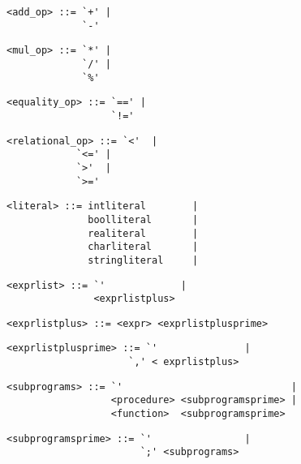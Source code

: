 \begin{footnotesize}
\begin{lstlisting}[frame=single, label={add_op}, language=pie]
<add_op> ::= `+' |
             `-'
\end{lstlisting}

\begin{lstlisting}[frame=single, label={mul_op}, language=pie]
<mul_op> ::= `*' |
             `/' |
             `%'
\end{lstlisting}

\begin{lstlisting}[frame=single, label={equality_op}, language=pie]
<equality_op> ::= `==' |
                  `!='
\end{lstlisting}

\begin{lstlisting}[frame=single, label={relational_op}, language=pie]
<relational_op> ::= `<'  |
	   	    `<=' |
		    `>'  |
		    `>='
\end{lstlisting}

\begin{lstlisting}[frame=single, label={literal}, language=pie]
<literal> ::= intliteral        |
              boolliteral       |
              realiteral        |
              charliteral       |
              stringliteral     |
\end{lstlisting}

\begin{lstlisting}[frame=single, label={exprlist}, language=pie]
<exprlist> ::= `'             |
               <exprlistplus>
\end{lstlisting}

\begin{lstlisting}[frame=single, label={exprlistplus}, language=pie]
<exprlistplus> ::= <expr> <exprlistplusprime>
\end{lstlisting}

\begin{lstlisting}[frame=single, label={exprlistplusprime}, language=pie]
<exprlistplusprime> ::= `'               |
                     `,' < exprlistplus>
\end{lstlisting}

\begin{lstlisting}[frame=single, label={subprograms}, language=pie]
<subprograms> ::= `'                             |
                  <procedure> <subprogramsprime> |
                  <function>  <subprogramsprime>
\end{lstlisting}

\begin{lstlisting}[frame=single, label={subprogramsprime}, language=pie]
<subprogramsprime> ::= `'                |
                       `;' <subprograms>
\end{lstlisting}


\end{footnotesize}
